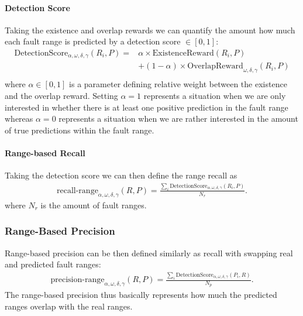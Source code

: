 \paragraph{Detection Score}

Taking the existence and overlap rewards we can quantify the amount how much each fault range is predicted by a detection score $\in [0, 1]$:
\begin{align*}
    \text{DetectionScore}_{\alpha, \omega, \delta, \gamma}(R_i, P) = &\alpha \times \text{ExistenceReward}(R_i, P) \\
    &+ (1 - \alpha) \times \text{OverlapReward}_{\omega, \delta, \gamma}(R_i, P) \\ 
\end{align*}
where $\alpha \in [0, 1]$ is a parameter defining relative weight between the existence and the overlap reward.
Setting $\alpha = 1$ represents a situation when we are only interested in whether there is at least one positive prediction in the fault range whereas $\alpha = 0$ represents a situation when we are rather interested in the amount of true predictions within the fault range.

\paragraph{Range-based Recall}
Taking the detection score we can then define the range recall as
\begin{align*}
    \text{recall-range}_{\alpha, \omega, \delta, \gamma}(R, P) = \frac{\sum_{i}\text{DetectionScore}_{\alpha, \omega, \delta, \gamma}(R_i, P)}{N_r}.
\end{align*}
where $N_r$ is the amount of fault ranges.

\subsubsection{Range-Based Precision}

Range-based precision can be then defined similarly as recall with swapping real and predicted fault ranges:
\begin{align*}
    \text{precision-range}_{\alpha, \omega, \delta, \gamma}(R, P) = \frac{\sum_{i}\text{DetectionScore}_{\alpha, \omega, \delta, \gamma}(P_i, R)}{N_p}.
\end{align*}
The range-based precision thus basically represents how much the predicted ranges overlap with the real ranges.


